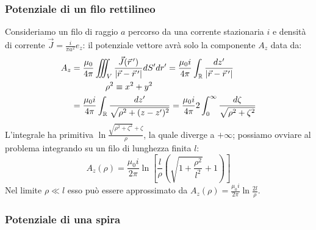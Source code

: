 \documentclass[]{article}
\begin{document}
\subsubsection{Potenziale di un filo rettilineo}

Consideriamo un filo di raggio $ a $ percorso da una corrente stazionaria $ i $ e densità di corrente $ \vec{J} = \frac{i}{\pi a^2} \hat{e}_z $: il potenziale vettore avrà solo la componente $ A_z $ data da:
\begin{equation}
	\begin{split}
		A_z &= \displaystyle\frac{\mu_0}{4\pi} \iiint_V \displaystyle\frac{\vec{J}(\vec{r}\,')}{\left\lvert\vec{r} - \vec{r}\,'\right\rvert} dS' dr' = \displaystyle\frac{\mu_0 i}{4\pi} \int_{\mathbb{R}} \displaystyle\frac{dz'}{\left\lvert\vec{r} - \vec{r}\,'\right\rvert} \\ 
		    & \qquad\qquad \rho^2 \equiv x^2 + y^2 \\ 
		    &= \displaystyle\frac{\mu_0 i}{4\pi} \int_{\mathbb{R}} \displaystyle\frac{dz'}{\sqrt{\rho^2 + (z - z')^2}} = \displaystyle\frac{\mu_0 i}{4\pi} 2\int_0^{\infty} \displaystyle\frac{d\zeta}{\sqrt{\rho^2 + \zeta^2}}
	\end{split}
	\label{eq:pot-filo-rett}
\end{equation}
L'integrale ha primitiva $ \ln{\frac{\sqrt{\rho^2 + \zeta^2} + \zeta}{\rho}} $, la quale diverge a $ +\infty $; possiamo ovviare al problema integrando su un filo di lunghezza finita $ l $:
\begin{equation}
	A_z (\rho) = \displaystyle\frac{\mu_0 i}{2\pi} \ln\left[ \displaystyle\frac{l}{\rho} \left( \sqrt{1 + \displaystyle\frac{\rho^2}{l^2}} + 1 \right) \right]
	\label{eq:pot-filo-rett-fin}
\end{equation}
Nel limite $ \rho \ll l $ esso può essere approssimato da $ A_z (\rho) = \displaystyle\frac{\mu_0 i}{2\pi} \ln{\frac{2l}{\rho}} $.

\subsubsection{Potenziale di una spira}
\end{document}

